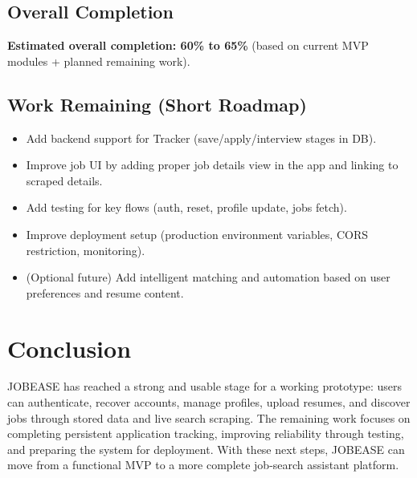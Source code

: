 \documentclass[12pt,a4paper]{report}
\begin{document}
\section*{Overall Completion}
\noindent
\textbf{Estimated overall completion: 60\% to 65\%} (based on current MVP modules + planned remaining work).

\section*{Work Remaining (Short Roadmap)}
\begin{itemize}[leftmargin=*, itemsep=6pt]
  \item Add backend support for Tracker (save/apply/interview stages in DB).
  \item Improve job UI by adding proper job details view in the app and linking to scraped details.
  \item Add testing for key flows (auth, reset, profile update, jobs fetch).
  \item Improve deployment setup (production environment variables, CORS restriction, monitoring).
  \item (Optional future) Add intelligent matching and automation based on user preferences and resume content.
\end{itemize}

\chapter{Conclusion}
\noindent
JOBEASE has reached a strong and usable stage for a working prototype: users can authenticate, recover accounts, manage profiles, upload resumes, and discover jobs through stored data and live search scraping. The remaining work focuses on completing persistent application tracking, improving reliability through testing, and preparing the system for deployment. With these next steps, JOBEASE can move from a functional MVP to a more complete job-search assistant platform.
\end{document}
